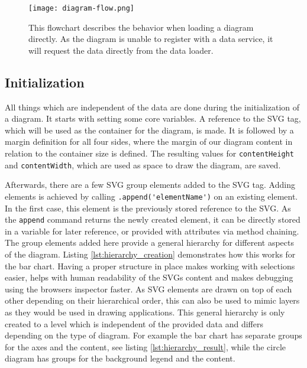 \begin{figure}[ht]
    \texttt{[image: diagram-flow.png]}
    \captionsetup{width=0.9\textwidth}
    \caption[diagram-flowchart]{This flowchart describes the behavior when loading a diagram directly. As the diagram is unable to register with a data service, it will request the data directly from the data loader.}
    \label{fig:diagram-flowchart}
\end{figure}

\subsection{Initialization}\label{sec:initialization}
All things which are independent of the data are done during the initialization of a diagram. It starts with setting some core variables. A reference to the SVG tag, which will be used as the container for the diagram, is made. It is followed by a margin definition for all four sides, where the margin of our diagram content in relation to the container size is defined. The resulting values for \verb|contentHeight| and \verb|contentWidth|, which are used as space to draw the diagram, are saved. 

Afterwards, there are a few SVG group elements added to the SVG tag. Adding elements is achieved by calling \verb|.append('elementName')| on an existing element. In the first case, this element is the previously stored reference to the SVG. As the \verb|append| command returns the newly created element, it can be directly stored in a variable for later reference, or provided with attributes via method chaining. The group elements added here provide a general hierarchy for different aspects of the diagram. Listing \ref{lst:hierarchy_creation} demonstrates how this works for the bar chart. Having a proper structure in place makes working with selections easier, helps with human readability of the SVGs content and makes debugging using the browsers inspector faster. As SVG elements are drawn on top of each other depending on their hierarchical order, this can also be used to mimic layers as they would be used in drawing applications. This general hierarchy is only created to a level which is independent of the provided data and differs depending on the type of diagram. For example the bar chart has separate groups for the axes and the content, see listing \ref{lst:hierarchy_result}, while the circle diagram has groups for the background legend and the content.

